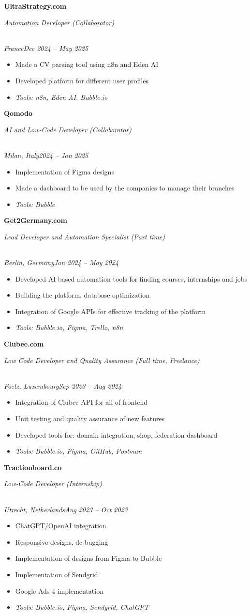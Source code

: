 \documentclass[a4paper,10pt]{article}
\newcommand{\role}[4]{\vspace{3pt}\noindent\hspace{0.6em}\parbox[t]{0.38\textwidth}{\raggedright\textbf{#1}}\hfill\parbox[t]{0.58\textwidth}{\raggedleft\textit{#2}}\\{\textit{#3}\hfill\textit{#4}}\vspace{1pt}}
\begin{document}
\role{UltraStrategy.com}{Automation Developer (Collaborator)}{France}{Dec 2024 -- May 2025}
\begin{itemize}
\item Made a CV parsing tool using n8n and Eden AI
\item Developed platform for different user profiles
\item \textit{Tools: n8n, Eden AI, Bubble.io}
\end{itemize}

\role{Qomodo}{AI and Low-Code Developer (Collaborator)}{Milan, Italy}{2024 -- Jan 2025}
\begin{itemize}
\item Implementation of Figma designs
\item Made a dashboard to be used by the companies to manage their branches
\item \textit{Tools: Bubble}
\end{itemize}

\role{Get2Germany.com}{Lead Developer and Automation Specialist (Part time)}{Berlin, Germany}{Jan 2024 -- May 2024}
\begin{itemize}
\item Developed AI based automation tools for finding courses, internships and jobs
\item Building the platform, database optimization
\item Integration of Google APIs for effective tracking of the platform
\item \textit{Tools: Bubble.io, Figma, Trello, n8n}
\end{itemize}

\role{Clubee.com}{Low Code Developer and Quality Assurance (Full time, Freelance)}{Foetz, Luxembourg}{Sep 2023 -- Aug 2024}
\begin{itemize}
\item Integration of Clubee API for all of frontend
\item Unit testing and quality assurance of new features
\item Developed tools for: domain integration, shop, federation dashboard
\item \textit{Tools: Bubble.io, Figma, GitHub, Postman}
\end{itemize}

\role{Tractionboard.co}{Low-Code Developer (Internship)}{Utrecht, Netherlands}{Aug 2023 -- Oct 2023}
\begin{itemize}
\item ChatGPT/OpenAI integration
\item Responsive designs, de-bugging
\item Implementation of designs from Figma to Bubble
\item Implementation of Sendgrid
\item Google Ads 4 implementation
\item \textit{Tools: Bubble.io, Figma, Sendgrid, ChatGPT}
\end{itemize}
\end{document}
